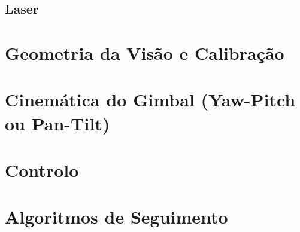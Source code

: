 \subsection{Laser}

\section{Geometria da Visão e Calibração}

\section{Cinemática do Gimbal (Yaw-Pitch ou Pan-Tilt)}

\section{Controlo}

\section{Algoritmos de Seguimento}